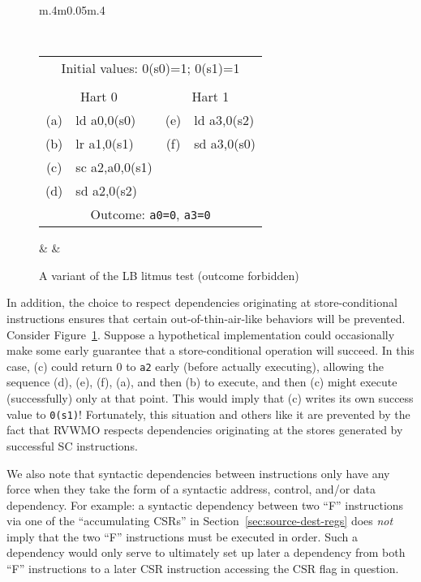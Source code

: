 \begin{figure}[h!]
  \centering
  \begin{tabular}{m{.4\linewidth}m{0.05\linewidth}m{.4\linewidth}}
  {
    \tt\small
    \begin{tabular}{cl||cl}
    \multicolumn{4}{c}{Initial values: 0(s0)=1; 0(s1)=1} \\
    \\
    \multicolumn{2}{c}{Hart 0} & \multicolumn{2}{c}{Hart 1} \\
    \hline
      (a) & ld a0,0(s0)    & (e) & ld a3,0(s2) \\
      (b) & lr a1,0(s1)    & (f) & sd a3,0(s0) \\
      (c) & sc a2,a0,0(s1) &                    \\
      (d) & sd a2,0(s2)    &                    \\
      \hline
      \multicolumn{4}{c}{Outcome: {\tt a0=0}, {\tt a3=0}}
    \end{tabular}
  }
  & &
  
  \end{tabular}
  \caption{A variant of the LB litmus test (outcome forbidden)}
  \label{fig:litmus:successdeps}
\end{figure}

In addition, the choice to respect dependencies originating at store-conditional instructions ensures that certain out-of-thin-air-like behaviors will be prevented.
Consider Figure~\ref{fig:litmus:successdeps}.
Suppose a hypothetical implementation could occasionally make some early guarantee that a store-conditional operation will succeed.
In this case, (c) could return 0 to {\tt a2} early (before actually executing), allowing the sequence (d), (e), (f), (a), and then (b) to execute, and then (c) might execute (successfully) only at that point.
This would imply that (c) writes its own success value to {\tt 0(s1)}!
Fortunately, this situation and others like it are prevented by the fact that RVWMO respects dependencies originating at the stores generated by successful SC instructions.

We also note that syntactic dependencies between instructions only have any force when they take the form of a syntactic address, control, and/or data dependency.
For example: a syntactic dependency between two ``F'' instructions via one of the ``accumulating CSRs'' in Section~\ref{sec:source-dest-regs} does {\em not} imply that the two ``F'' instructions must be executed in order.
Such a dependency would only serve to ultimately set up later a dependency from both ``F'' instructions to a later CSR instruction accessing the CSR flag in question.

